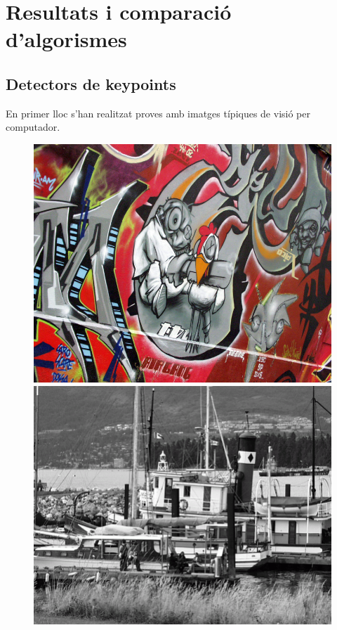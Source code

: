 \section{Resultats i comparació d'algorismes}

	\subsection{Detectors de keypoints}
	En primer lloc s'han realitzat proves amb imatges típiques de visió per computador.
		\begin{figure}[!htb]
				\includegraphics[width=\linewidth]{images/experiments/graf3}
				\label{fig:awesome_image1}
			\endminipage\hfill
				\includegraphics[width=\linewidth]{images/experiments/boat}

\end{figure}
